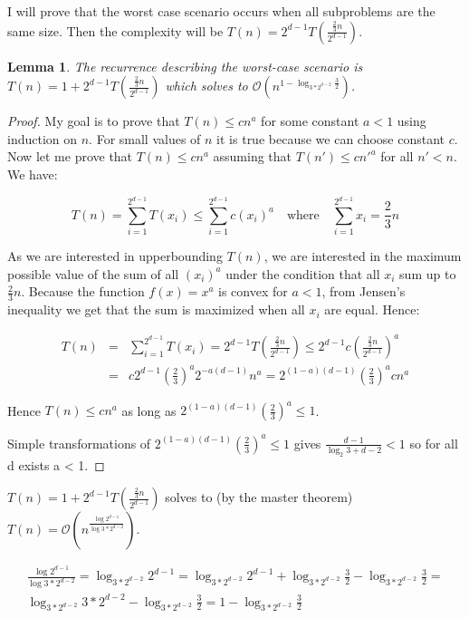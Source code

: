 \documentclass[10pt,a4paper]{article}
\newtheorem{lemma}{Lemma}
\newcommand{\Oh}{\mathcal{O}}
\begin{document}
I will prove that the worst case scenario occurs when all subproblems are the same size. Then the complexity will be $T(n)=2^{d-1}T(\frac{\frac{2}{3}n}{2^{d-1}})$.

\begin{lemma}\label{lem:5}
The recurrence describing the worst-case scenario is $T(n)=1+2^{d-1}T(\frac{\frac{2}{3}n}{2^{d-1}})$ which solves to $\Oh(n^{1 - \log_{3*2^{d-2}}{\frac{3}{2}}})$.
\end{lemma}

\begin{proof}

My goal is to prove that $T(n) \leq c n^a$ for some constant $a < 1$ using induction on $n$. For small values of $n$ it is true because we can choose constant $c$. Now let me prove that $T(n) \leq c n^a$ assuming that $T(n') \leq c n'^a$ for all $n'<n$. We have:

$$T(n) = \displaystyle\sum\limits_{i=1}^{2^{d-1}} T(x_i)\leq\displaystyle\sum\limits_{i=1}^{2^{d-1}} c(x_i)^{a}  \quad\text{where}\quad  \displaystyle\sum\limits_{i=1}^{2^{d-1}} x_i = \frac{2}{3}n$$ 

As we are interested in upperbounding $T(n)$, we are interested in the maximum possible value of the sum of all $(x_i)^{a}$ under the condition that all $x_{i}$ sum up to $\frac{2}{3}n$. Because the function $f(x)=x^{a}$ is convex for $a<1$, from Jensen's inequality we get that the sum is maximized when all $x_{i}$ are equal. Hence:

\begin{eqnarray*}
T(n) &=& \displaystyle\sum\limits_{i=1}^{2^{d-1}} T(x_i) = 2^{d-1} T\left(\frac{\frac{2}{3}n}{2^{d-1}}\right) \leq 2^{d-1} c \left(\frac{\frac{2}{3}n}{2^{d-1}}\right) ^ a  \\
& = & c 2^{d-1} \left(\frac{2}{3}\right)^a 2^{-a(d-1)} n^a = 2^{(1-a)(d-1)} \left(\frac{2}{3}\right)^a c n^a
\end{eqnarray*}

Hence $T(n)\leq c n^{a}$ as long as $2^{(1-a)(d-1)} (\frac{2}{3})^a \leq 1$.
\bigskip


Simple transformations of $2^{(1-a)(d-1)} (\frac{2}{3})^a \leq 1$ gives $\frac{d-1}{\log_2{3} + d - 2} < 1$ so for all d exists a < 1.

\end{proof}

$T(n)=1+2^{d-1}T(\frac{\frac{2}{3}n}{2^{d-1}})$ solves to (by the master theorem) $T(n)=\Oh(n^{\frac{\log 2^{d-1}}{\log 3*2^{d-2}}})$.

\begin{eqnarray*}
\frac{\log 2^{d-1}}{\log 3*2^{d-2}} = \log_{3*2^{d-2}}{2^{d-1}} = \log_{3*2^{d-2}}{2^{d-1}} + \log_{3*2^{d-2}}{\frac{3}{2}} - \log_{3*2^{d-2}}{\frac{3}{2}} = \\ \log_{3*2^{d-2}}{3*2^{d-2}} - \log_{3*2^{d-2}}{\frac{3}{2}} = 1 - \log_{3*2^{d-2}}{\frac{3}{2}}
\end{eqnarray*}
\end{document}

